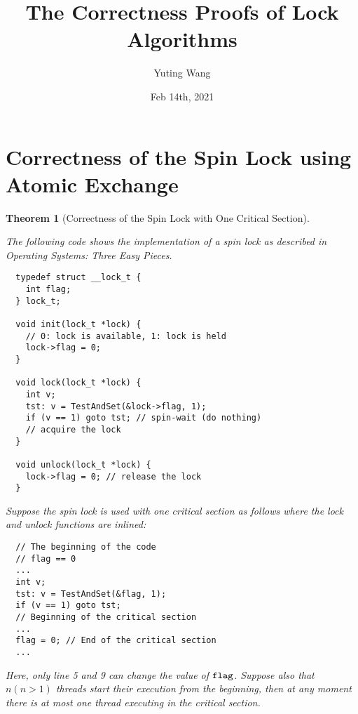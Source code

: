 \documentclass{article}[10pt]
\title{The Correctness Proofs of Lock Algorithms}
\author{Yuting Wang}
\date{Feb 14th, 2021}
\newtheorem{mythm}[mydef]{Theorem}
\newcommand{\kwd}[1]{\ensuremath{\text{\ttfamily #1}}\xspace}
\def\kflag{\kwd{flag}}
\begin{document}
\maketitle

\section{Correctness of the Spin Lock using Atomic Exchange}
\label{sec:spin-lock-xchg}

\begin{mythm}[Correctness of the Spin Lock with One Critical Section]
\label{thm:spin-lock-correct-xchg}

The following code shows the implementation of a spin lock as
described in Operating Systems: Three Easy Pieces.
%
\begin{lstlisting}
  typedef struct __lock_t {
    int flag;
  } lock_t;

  void init(lock_t *lock) {
    // 0: lock is available, 1: lock is held
    lock->flag = 0;
  }

  void lock(lock_t *lock) {
    int v;
    tst: v = TestAndSet(&lock->flag, 1);
    if (v == 1) goto tst; // spin-wait (do nothing)
    // acquire the lock
  }

  void unlock(lock_t *lock) {
    lock->flag = 0; // release the lock
  }  
\end{lstlisting}
%
Suppose the spin lock is used with one critical section as follows
where the lock and unlock functions are inlined:
%
\begin{lstlisting}
  // The beginning of the code
  // flag == 0
  ...
  int v;
  tst: v = TestAndSet(&flag, 1);
  if (v == 1) goto tst;
  // Beginning of the critical section
  ...
  flag = 0; // End of the critical section
  ...
\end{lstlisting}
%
Here, only line 5 and 9 can change the value of \kflag.
%
Suppose also that $n (n > 1)$ threads start their execution from the
beginning, then at any moment there is at most one thread executing in
the critical section.
\end{mythm}
%
\end{document}
